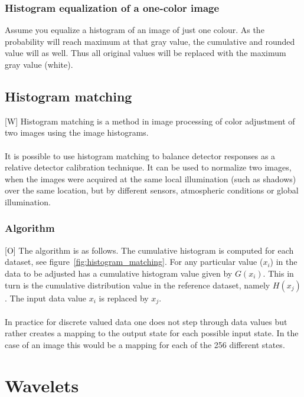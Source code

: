 \documentclass[12pt]{article}
\begin{document}
	\subsubsection{Histogram equalization of a one-color image}
	Assume you equalize a histogram of an image of just one colour. As the probability will reach maximum
	at that gray value, the cumulative and rounded value will as well. Thus all original values will be 
	replaced with the maximum gray value (white).
	\subsection{Histogram matching}
	[W] Histogram matching is a method in image processing of color adjustment of two images using 
	the image histograms.\\
	\\
	It is possible to use histogram matching to balance detector responses as a relative detector 
	calibration technique. It can be used to normalize two images, when the images were acquired at 
	the same local illumination (such as shadows) over the same location, but by different sensors, 
	atmospheric conditions or global illumination.\\
	
	\subsubsection{Algorithm}
	[O] The algorithm is as follows. The cumulative histogram is computed for each dataset, see 
	figure~\ref{fig:histogram_matching}. For any particular value ($x_i$) in the data to be adjusted 
	has a cumulative histogram value given 
	by $G(x_i)$. This in turn is the cumulative distribution value in the reference dataset, namely $H(x_j)$. 
	The input data value $x_i$ is replaced by $x_j$. \\
    \\
    In practice for discrete valued data one does not step through data values but rather creates a 
    mapping to the output state for each possible input state. In the case of an image this would be a 
    mapping for each of the 256 different states. 
%	
%	
\section{Wavelets}
\end{document}
